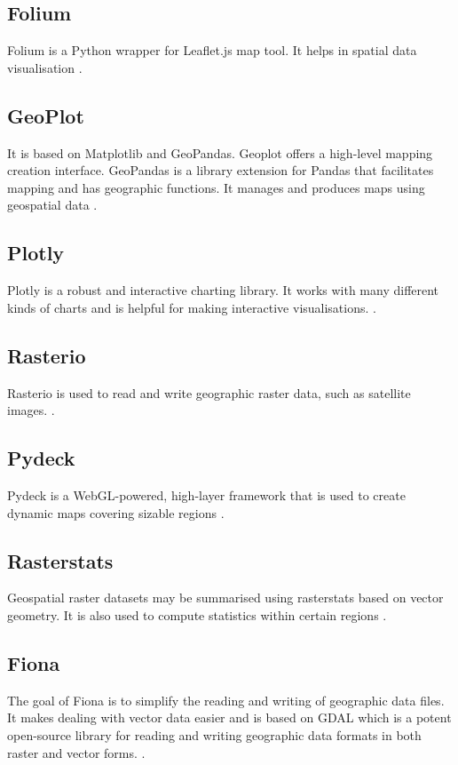 \subsection{Folium}
Folium is a Python wrapper for Leaflet.js map tool. It helps in spatial data visualisation \cite{folium}.

\subsection{GeoPlot}
It is based on Matplotlib and GeoPandas. Geoplot offers a high-level mapping creation interface. GeoPandas is a library extension for Pandas that facilitates mapping and has geographic functions. It manages and produces maps using geospatial data \cite{geoplot, geopandas, matplotlib}.

\subsection{Plotly}
\label{dv_plotly}
Plotly is a robust and interactive charting library. It works with many different kinds of charts and is helpful for making interactive visualisations. \cite{plotly}.

\subsection{Rasterio}
Rasterio is used to read and write geographic raster data, such as satellite images. \cite{rasterio}.

\subsection{Pydeck}
Pydeck is a WebGL-powered, high-layer framework that is used to create dynamic maps covering sizable regions \cite{pydeck}.

\subsection{Rasterstats}
Geospatial raster datasets may be summarised using rasterstats based on vector geometry. It is also used to compute statistics within certain regions \cite{rasterstats}.

\subsection{Fiona}
The goal of Fiona is to simplify the reading and writing of geographic data files. It makes dealing with vector data easier and is based on GDAL which is a potent open-source library for reading and writing geographic data formats in both raster and vector forms. \cite{fiona, gdal}.



